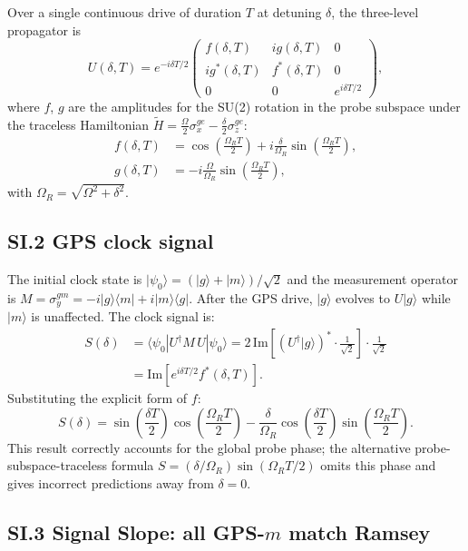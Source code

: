 \documentclass[aps,pra,twocolumn,superscriptaddress,longbibliography]{revtex4-2}
\newcommand{\be}{\begin{equation}}
\newcommand{\ee}{\end{equation}}
\begin{document}
Over a single continuous drive of duration $T$ at detuning $\delta$, the three-level
propagator is
\be
  U(\delta, T) = e^{-i\delta T/2}
  \begin{pmatrix}
    f(\delta,T) & ig(\delta,T) & 0 \\
    ig^*(\delta,T) & f^*(\delta,T) & 0 \\
    0 & 0 & e^{i\delta T/2}
  \end{pmatrix},
  \label{eq:3level_prop}
\ee
where $f$, $g$ are the amplitudes for the SU(2) rotation in the probe
subspace under the traceless Hamiltonian
$\tilde{H} = \tfrac{\Omega}{2}\sigma_x^{ge} - \tfrac{\delta}{2}\sigma_z^{ge}$:
\begin{align}
  f(\delta,T) &= \cos\!\left(\frac{\Omega_R T}{2}\right)
    + i\frac{\delta}{\Omega_R}\sin\!\left(\frac{\Omega_R T}{2}\right), \\
  g(\delta,T) &= -i\frac{\Omega}{\Omega_R}\sin\!\left(\frac{\Omega_R T}{2}\right),
\end{align}
with $\Omega_R = \sqrt{\Omega^2 + \delta^2}$.

\subsection*{SI.2 GPS clock signal}

The initial clock state is $|\psi_0\rangle = (|g\rangle+|m\rangle)/\sqrt{2}$ and
the measurement operator is $M = \sigma_y^{gm} = -i|g\rangle\langle m|+i|m\rangle\langle g|$.
After the GPS drive, $|g\rangle$ evolves to $U|g\rangle$ while $|m\rangle$ is
unaffected.  The clock signal is:
\begin{align}
  S(\delta)
  &= \langle\psi_0|U^\dagger M\,U|\psi_0\rangle
   = 2\,\mathrm{Im}\!\left[\left(U^\dagger|g\rangle\right)^* \cdot
     \frac{1}{\sqrt{2}}\right] \cdot \frac{1}{\sqrt{2}} \\
  &= \mathrm{Im}\!\left[e^{i\delta T/2}f^*(\delta,T)\right].
\end{align}
Substituting the explicit form of $f$:
\be
  \boxed{
  S(\delta) = \sin\!\left(\frac{\delta T}{2}\right)\cos\!\left(\frac{\Omega_R T}{2}\right)
            - \frac{\delta}{\Omega_R}\cos\!\left(\frac{\delta T}{2}\right)
              \sin\!\left(\frac{\Omega_R T}{2}\right).}
  \label{eq:gps_signal_supp}
\ee
This result correctly accounts for the global probe phase; the alternative
probe-subspace-traceless formula $S = (\delta/\Omega_R)\sin(\Omega_R T/2)$ omits
this phase and gives incorrect predictions away from $\delta = 0$.

\subsection*{SI.3 Signal Slope: all GPS-$m$ match Ramsey}
\end{document}
